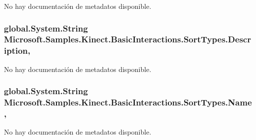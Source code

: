 No hay documentación de metadatos disponible. 

\hypertarget{class_microsoft_1_1_samples_1_1_kinect_1_1_basic_interactions_1_1_sort_types_a93f5c6278aeb6821e1b8d3a3502101ec}{
\subsubsection[{Description}]{\setlength{\rightskip}{0pt plus 5cm}global.\-System.\-String Microsoft.\-Samples.\-Kinect.\-Basic\-Interactions.\-Sort\-Types.\-Description\hspace{0.3cm}{\ttfamily [get]}, {\ttfamily [set]}}}\label{class_microsoft_1_1_samples_1_1_kinect_1_1_basic_interactions_1_1_sort_types_a93f5c6278aeb6821e1b8d3a3502101ec}


No hay documentación de metadatos disponible. 

\hypertarget{class_microsoft_1_1_samples_1_1_kinect_1_1_basic_interactions_1_1_sort_types_af80bf742ee5db7a54f3fe66a8ebd7e67}{
\subsubsection[{Name}]{\setlength{\rightskip}{0pt plus 5cm}global.\-System.\-String Microsoft.\-Samples.\-Kinect.\-Basic\-Interactions.\-Sort\-Types.\-Name\hspace{0.3cm}{\ttfamily [get]}, {\ttfamily [set]}}}\label{class_microsoft_1_1_samples_1_1_kinect_1_1_basic_interactions_1_1_sort_types_af80bf742ee5db7a54f3fe66a8ebd7e67}


No hay documentación de metadatos disponible. 

